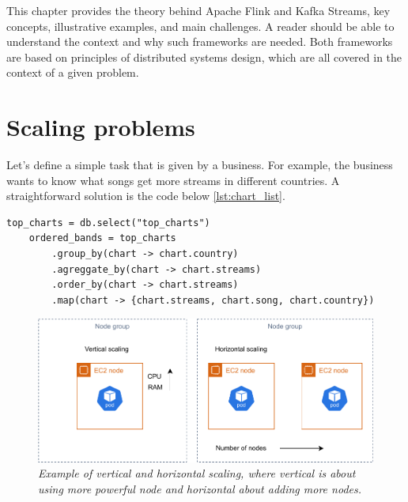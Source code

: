 This chapter provides the theory behind Apache Flink and Kafka Streams, key concepts,
illustrative examples, and main challenges.
A reader should be able to understand the context and why such frameworks are needed.
Both frameworks are based on principles of distributed systems design,
which are all covered in the context of a given problem.


\section{Scaling problems}\label{subsec:simple-pip}
Let's define a simple task that is given by a business.
For example, the business wants to know what songs get more streams in different countries.
A straightforward solution is the code below \ref{lst:chart_list}.

\begin{lstlisting}[label={lst:chart_list}]
    top_charts = db.select("top_charts")
    ordered_bands = top_charts
        .group_by(chart -> chart.country)
        .agreggate_by(chart -> chart.streams)
        .order_by(chart -> chart.streams)
        .map(chart -> {chart.streams, chart.song, chart.country})

\end{lstlisting}

\begin{figure}[ht]
    \centering
    \includegraphics[width=1\textwidth]{figures/vertical-horizontal-scaling}
    \caption{\textit{Example of vertical and horizontal scaling, where vertical is about using more powerful node
    and horizontal about adding more nodes.}}
    \label{fig:vert-hor-scal}
\end{figure}


